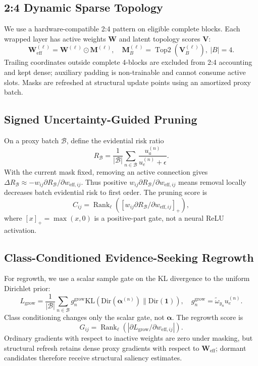 \documentclass[letterpaper]{article} %
\newcommand{\Dir}{\text{Dir}}
\newcommand{\KL}{\text{KL}}
\begin{document}
\subsection{2:4 Dynamic Sparse Topology}
We use a hardware-compatible 2:4 pattern on eligible complete blocks. Each wrapped layer has active weights $\bm{W}$ and latent topology scores $\bm{V}$:
\begin{equation}
\bm{W}^{(\ell)}_{\mathrm{eff}}=\bm{W}^{(\ell)}\odot\bm{M}^{(\ell)},\quad
\bm{M}^{(\ell)}_B=\operatorname{Top2}(\bm{V}^{(\ell)}_B),\ |B|=4 .
\end{equation}
Trailing coordinates outside complete 4-blocks are excluded from 2:4 accounting and kept dense; auxiliary padding is non-trainable and cannot consume active slots. Masks are refreshed at structural update points using an amortized proxy batch.

\subsection{Signed Uncertainty-Guided Pruning}
On a proxy batch $\mathcal{B}$, define the evidential risk ratio
\begin{equation}
R_{\mathcal{B}}=\frac{1}{|\mathcal{B}|}\sum_{n\in\mathcal{B}}\frac{u_a^{(n)}}{u_e^{(n)}+\epsilon}.
\end{equation}
With the current mask fixed, removing an active connection gives $\Delta R_{\mathcal B}\approx -w_{ij}\partial R_{\mathcal B}/\partial w_{\mathrm{eff},ij}$. Thus positive $w_{ij}\partial R_{\mathcal B}/\partial w_{\mathrm{eff},ij}$ means removal locally decreases batch evidential risk to first order. The pruning score is
\begin{equation}
C_{ij}=\operatorname{Rank}_{\ell}\left([w_{ij}\partial R_{\mathcal B}/\partial w_{\mathrm{eff},ij}]_+\right),
\end{equation}
where $[x]_+=\max(x,0)$ is a positive-part gate, not a neural ReLU activation.

\subsection{Class-Conditioned Evidence-Seeking Regrowth}
For regrowth, we use a scalar sample gate on the KL divergence to the uniform Dirichlet prior:
\begin{equation}
L_{\mathrm{grow}}=\frac{1}{|\mathcal{B}|}\sum_{n\in\mathcal{B}} g_n^{\mathrm{grow}}
\KL(\Dir(\bm{\alpha}^{(n)})\parallel\Dir(\mathbf{1})),\quad
g_n^{\mathrm{grow}}=\tilde{\omega}_{y_n}u_e^{(n)} .
\end{equation}
Class conditioning changes only the scalar gate, not $\bm{\alpha}$. The regrowth score is
\begin{equation}
G_{ij}=\operatorname{Rank}_{\ell}\left(\left|\partial L_{\mathrm{grow}}/\partial w_{\mathrm{eff},ij}\right|\right).
\end{equation}
Ordinary gradients with respect to inactive weights are zero under masking, but structural refresh retains dense proxy gradients with respect to $\bm{W}_{\mathrm{eff}}$; dormant candidates therefore receive structural saliency estimates.
\end{document}
